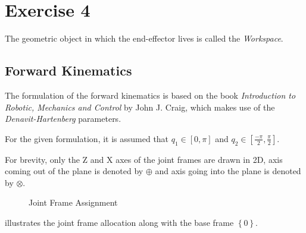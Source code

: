 \section{Exercise 4}
The geometric object in which the end-effector lives is called the \emph{Workspace}.
\subsection{Forward Kinematics}
The formulation of the forward kinematics is based on the book \emph{Introduction to Robotic, Mechanics and Control} by John J. Craig, which makes use of the \emph{Denavit-Hartenberg} parameters.

For the given formulation, it is assumed that $q_1 \in \left[0,\pi\right]$ and $q_2 \in \left[\frac{-\pi}{2},\frac{\pi}{2}\right]$.

For brevity, only the Z and X axes of the joint frames are drawn in 2D, axis coming out of the plane is denoted by $\oplus$ and axis going into the plane is denoted by $\otimes$.

\begin{figure}[h!]
	
	\caption{Joint Frame Assignment}
	\label{fig:frames}
\end{figure}

 illustrates the joint frame allocation along with the base frame $\left\{0\right\}$. 


